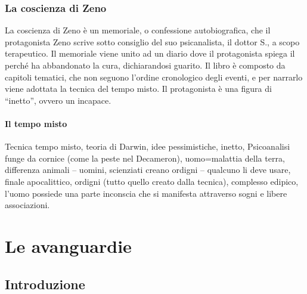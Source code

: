 \documentclass[10pt]{report}
\begin{document}
		\subsection{La coscienza di Zeno}
		La coscienza di Zeno è un memoriale, o confessione autobiografica, che il protagonista Zeno scrive sotto consiglio del suo psicanalista, il dottor S., a scopo terapeutico. Il memoriale viene unito ad un diario dove il protagonista spiega il perché ha abbandonato la cura, dichiarandosi guarito. Il libro è composto da capitoli tematici, che non seguono l’ordine cronologico degli eventi, e per narrarlo viene adottata la tecnica del tempo misto. Il protagonista è una figura di “inetto”, ovvero un incapace.
			\subsubsection{Il tempo misto}
			Tecnica tempo misto, teoria di Darwin, idee pessimistiche, inetto, Psicoanalisi funge da cornice (come la peste nel Decameron), uomo=malattia della terra, differenza animali – uomini, scienziati creano ordigni – qualcuno li deve usare, finale apocalittico, 
			ordigni (tutto quello creato dalla tecnica), complesso edipico, l’uomo possiede una parte inconscia che si manifesta attraverso sogni e libere associazioni.
	
	\chapter{Le avanguardie}
		\section{Introduzione}
\end{document}
